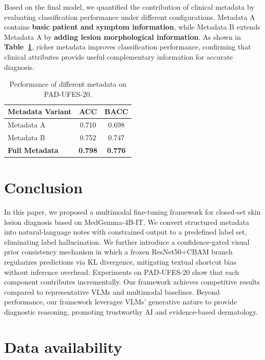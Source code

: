 \documentclass[preprint,12pt]{elsarticle}
\begin{document}
Based on the final model, we quantified the contribution of clinical metadata by evaluating classification performance under different configurations. Metadata A contains \textbf{basic patient and symptom information}, while Metadata B extends Metadata A by \textbf{adding lesion morphological information}. As shown in \textbf{Table~\ref{tab:metadata}}, richer metadata improves classification performance, confirming that clinical attributes provide useful complementary information for accurate diagnosis.



\begin{table}[!htbp]
	\centering
	\caption{Performance of different metadata on PAD-UFES-20.}
	\label{tab:metadata}
	\setlength{\tabcolsep}{15pt}
	\begin{tabular}{lcc}
		\toprule
		\textbf{Metadata Variant} & \textbf{ACC} & \textbf{BACC} \\
		\midrule
		Metadata A           & 0.710  & 0.698  \\
		Metadata B        & 0.752  & 0.747  \\
		\textbf{Full Metadata}             & \textbf{0.798} & \textbf{0.776 } \\
		\bottomrule
	\end{tabular}
\end{table}


\section{Conclusion}

In this paper, we proposed a multimodal fine-tuning framework for closed-set skin lesion diagnosis based on MedGemma-4B-IT. We convert structured metadata into natural-language notes with constrained output to a predefined label set, eliminating label hallucination. We further introduce a confidence-gated visual prior consistency mechanism in which a frozen ResNet50+CBAM branch regularizes predictions via KL divergence, mitigating textual shortcut bias without inference overhead. Experiments on PAD-UFES-20 show that each component contributes incrementally. Our framework achieves competitive results compared to representative VLMs and multimodal baselines. Beyond performance, our framework leverages VLMs' generative nature to provide diagnostic reasoning, promoting trustworthy AI and evidence-based dermatology.

\section*{Data availability}
\end{document}
